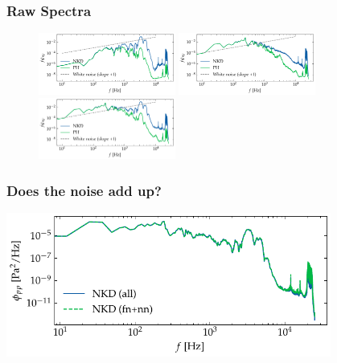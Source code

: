 \documentclass[aspectratio=169,9pt]{beamer}
\begin{document}
\begin{frame}
  \frametitle{Raw Spectra}
  \begin{figure}
    \centering
    \includegraphics[width=0.4\textwidth]{sanity/50psi/PH-NKD/calib_spectra_50psi_nonoise.pdf}
    \includegraphics[width=0.4\textwidth]{sanity/50psi/PH-NKD/calib_spectra_50psi_noise.pdf}
    \includegraphics[width=0.4\textwidth]{sanity/50psi/PH-NKD/calib_spectra_50psi_noiseWN.pdf}
  \end{figure}
\end{frame}

\begin{frame}
  \frametitle{Does the noise add up?}
    \centering
    \includegraphics[width=0.8\textwidth]{sanity/50psi/PH-NKD/calib_spectra_50psi_nkd_fn_plus_nn.pdf}
\end{frame}
\end{document}
